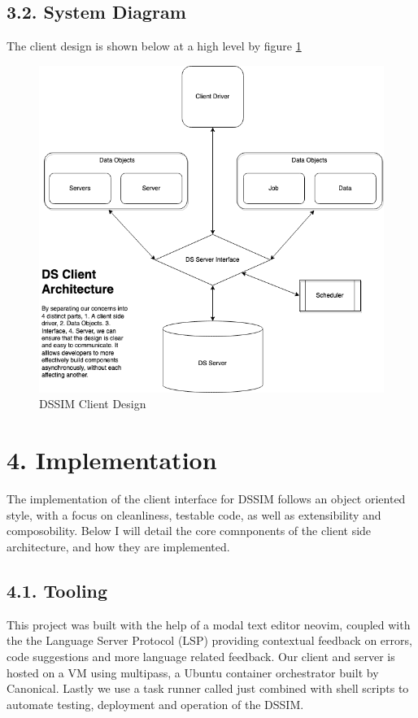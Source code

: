 \documentclass[a4paper]{article} %
\begin{document}
\subsection*{3.2. System Diagram}
The client design is shown below at a high level by figure \ref{CLIENT}
\begin{figure}[H]
    \centering
    \includegraphics[scale=0.7]{images/DSClient.png}
    \caption{DSSIM Client Design}
    \label{CLIENT}
\end{figure}

\section*{4. Implementation}
The implementation of the client interface for DSSIM follows an object oriented style, with a focus on cleanliness, testable code, as well as extensibility and composobility. Below I will detail the core comnponents of the client side architecture, and how they are implemented.

\subsection*{4.1. Tooling}
This project was built with the help of a modal text editor neovim\cite{neovim}, coupled with the the Language Server Protocol (LSP)\cite{lsp} providing contextual feedback on errors, code suggestions and more language related feedback. Our client and server is hosted on a VM using multipass, a Ubuntu container orchestrator built by Canonical. Lastly we use a task runner called just combined with shell scripts to automate testing, deployment and operation of the DSSIM.
\end{document}
